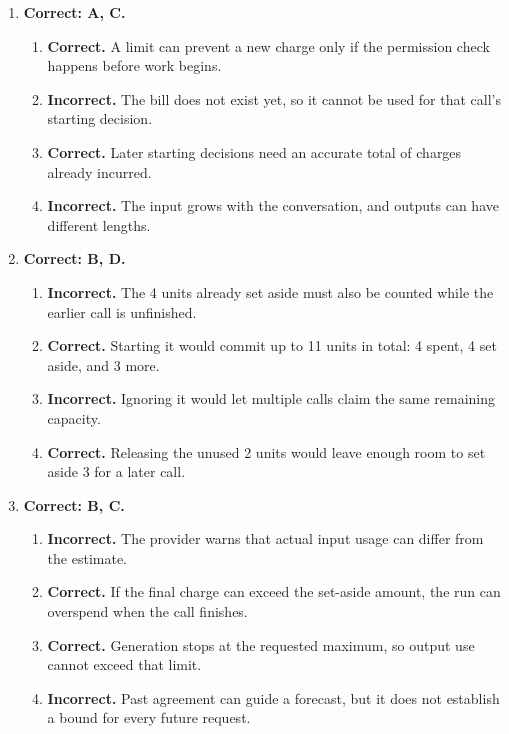 \begin{enumerate}[start=51,itemsep=0.7\baselineskip]
\item[{\hyperref[exercise:51]{51.}}] \begin{minipage}[t]{\linewidth}
\textbf{Correct: A, C.}
\begin{enumerate}[label=\textnormal{(\Alph*)},leftmargin=*,itemsep=0pt]
\item \textbf{Correct.} A limit can prevent a new charge only if the permission check happens before work begins.
\item \textbf{Incorrect.} The bill does not exist yet, so it cannot be used for that call's starting decision.
\item \textbf{Correct.} Later starting decisions need an accurate total of charges already incurred.
\item \textbf{Incorrect.} The input grows with the conversation, and outputs can have different lengths.
\end{enumerate}
\end{minipage}

\item[{\hyperref[exercise:52]{52.}}] \begin{minipage}[t]{\linewidth}
\textbf{Correct: B, D.}
\begin{enumerate}[label=\textnormal{(\Alph*)},leftmargin=*,itemsep=0pt]
\item \textbf{Incorrect.} The 4 units already set aside must also be counted while the earlier call is unfinished.
\item \textbf{Correct.} Starting it would commit up to 11 units in total: 4 spent, 4 set aside, and 3 more.
\item \textbf{Incorrect.} Ignoring it would let multiple calls claim the same remaining capacity.
\item \textbf{Correct.} Releasing the unused 2 units would leave enough room to set aside 3 for a later call.
\end{enumerate}
\end{minipage}

\item[{\hyperref[exercise:53]{53.}}] \begin{minipage}[t]{\linewidth}
\textbf{Correct: B, C.}
\begin{enumerate}[label=\textnormal{(\Alph*)},leftmargin=*,itemsep=0pt]
\item \textbf{Incorrect.} The provider warns that actual input usage can differ from the estimate.
\item \textbf{Correct.} If the final charge can exceed the set-aside amount, the run can overspend when the call finishes.
\item \textbf{Correct.} Generation stops at the requested maximum, so output use cannot exceed that limit.
\item \textbf{Incorrect.} Past agreement can guide a forecast, but it does not establish a bound for every future request.
\end{enumerate}
\end{minipage}


\end{enumerate}

